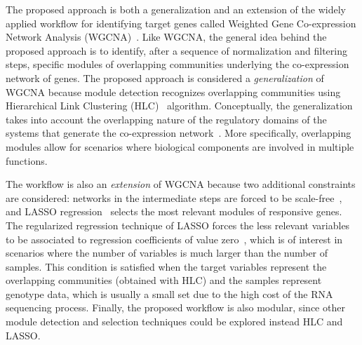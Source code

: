 The proposed approach is both a generalization and an
extension of the widely applied workflow 
for identifying target genes called 
Weighted Gene Co-expression Network Analysis
(WGCNA)~\cite{langfelder2008wgcna, tian2018identifying}.
Like WGCNA, the general idea behind the proposed
approach is to identify, after a sequence of normalization
and filtering steps, specific modules of overlapping communities
underlying the co-expression network of genes. 
The proposed approach is considered a \textit{generalization}
of WGCNA because module detection recognizes overlapping communities
using Hierarchical Link Clustering (HLC)~\cite{ahn2010link} algorithm.
Conceptually, the generalization takes into account
the overlapping nature of the regulatory domains of the
systems that generate the co-expression network~\cite{gaiteri2014beyond}.
More specifically, overlapping modules allow for 
scenarios where biological components  are involved in
multiple functions.
\vspace{0.5cm}

The workflow is also an \textit{extension} of WGCNA
because two additional constraints are considered:
networks in the intermediate steps are forced to be
scale-free~\cite{barabasi2003scale}, and LASSO
regression~\cite{tibshirani1996regression} selects the
most relevant modules of responsive genes.
The regularized regression technique of LASSO
forces the less relevant variables to be associated to regression
coefficients of value zero~\cite{desboulets2018review}, 
which is of interest
in scenarios where the number of variables is much larger than
the number of samples. This condition is satisfied when the target variables represent the
overlapping communities (obtained with HLC) and the samples represent genotype data,
which is usually a small set due to the high cost of the RNA sequencing process. 
Finally, the proposed workflow is also modular, since other module detection
and selection techniques could be explored instead HLC and LASSO.
\vspace{0.5cm}

